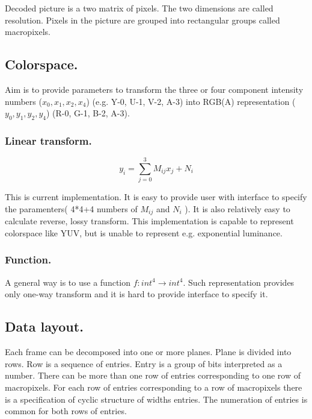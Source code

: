 Decoded picture is a two matrix of pixels. The two dimensions are called resolution. Pixels in the picture are grouped into rectangular groups called macropixels.

\subsection{Colorspace.}

Aim is to provide parameters to transform the three or four component intensity numbers ($x_0, x_1, x_2, x_4$) (e.g. Y-0, U-1, V-2, A-3) into RGB(A) representation ($y_0, y_1, y_2, y_4$) (R-0, G-1, B-2, A-3).

\subsubsection{Linear transform.}

\begin{displaymath}
y_i = \sum_{j=0}^3 M_{ij} x_j + N_i
\end{displaymath}

This is current implementation. It is easy to provide user with interface to specify the paramenters( 4*4+4 numbers of $M_{ij}$ and $N_i$ ). It is also relatively easy to calculate reverse, lossy transform. This implementation is capable to represent colorspace like YUV, but is unable to represent e.g. exponential luminance.

\subsubsection{Function.}

A general way is to use a function $f:int^4 \rightarrow int^4$. Such representation provides only one-way transform and it is hard to provide interface to specify it.

\subsection{Data layout.}

Each frame can be decomposed into one or more planes. Plane is divided into rows. Row is a sequence of entries. Entry is a group of bits interpreted as a number. There can be more than one row of entries corresponding to one row of macropixels. For each row of entries corresponding to a row of macropixels there is a specification of cyclic structure of widths entries. The numeration of entries is common for both rows of entries.

